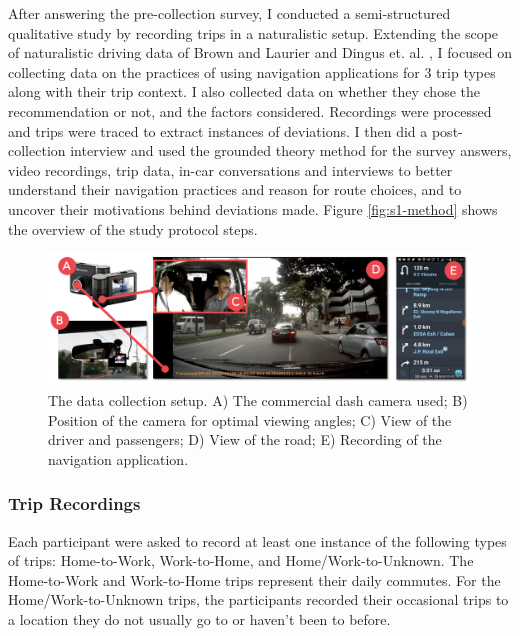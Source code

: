 After answering the pre-collection survey, I conducted a semi-structured qualitative study \cite{Soegaard2013} by recording trips in a naturalistic setup. Extending the scope of naturalistic driving data of Brown and Laurier \cite{Brown2012TheGPS} and Dingus et. al. \cite{Dingus1997a}, I focused on collecting data on the practices of using navigation applications for 3 trip types along with their trip context. I also collected data on whether they chose the recommendation or not, and the factors considered. Recordings were processed and trips were traced to extract instances of deviations. I then did a post-collection interview and used the grounded theory method \cite{Muller2016MachineMethod,Muller2014CuriosityMethod} for the survey answers, video recordings, trip data, in-car conversations and interviews to better understand their navigation practices and reason for route choices, and to uncover their motivations behind deviations made. Figure \ref{fig:s1-method} shows the overview of the study protocol steps.

\begin{figure}[t]
  \centering
  \includegraphics[scale=0.82]{figures/s1-data-collection-setup.png}
  \caption{The data collection setup. A) The commercial dash camera used; B) Position of the camera for optimal viewing angles; C) View of the driver and passengers; D) View of the road; E) Recording of the navigation application.}
  \label{fig:s1-setup}
\end{figure}

\subsubsection{Trip Recordings}
Each participant were asked to record at least one instance of the following types of trips: Home-to-Work, Work-to-Home, and Home/Work-to-Unknown. The Home-to-Work and Work-to-Home trips represent their daily commutes. For the Home/Work-to-Unknown trips, the participants recorded their occasional trips to a location they do not usually go to or haven't been to before. 

